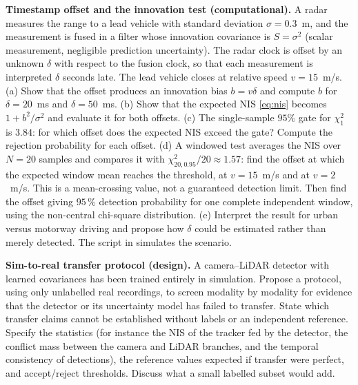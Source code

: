 \begin{prob}\label{prob:ch08:3}
\textbf{Timestamp offset and the innovation test (computational).} A radar measures the range to a lead vehicle with standard deviation $\sigma=0.3$~m, and the measurement is fused in a filter whose innovation covariance is $S=\sigma^2$ (scalar measurement, negligible prediction uncertainty). The radar clock is offset by an unknown $\delta$ with respect to the fusion clock, so that each measurement is interpreted $\delta$ seconds late. The lead vehicle closes at relative speed $v=15$~m/s. (a) Show that the offset produces an innovation bias $b=v\delta$ and compute $b$ for $\delta=20$~ms and $\delta=50$~ms. (b) Show that the expected NIS \eqref{eq:nis} becomes $1+b^2/\sigma^2$ and evaluate it for both offsets. (c) The single-sample $95\%$ gate for $\chi^2_1$ is $3.84$: for which offset does the expected NIS exceed the gate? Compute the rejection probability for each offset. (d) A windowed test averages the NIS over $N=20$ samples and compares it with $\chi^2_{20,0.95}/20\approx1.57$: find the offset at which the expected window mean reaches the threshold, at $v=15$~m/s and at $v=2$~m/s. This is a mean-crossing value, not a guaranteed detection limit. Then find the offset giving $95\,\%$ detection probability for one complete independent window, using the non-central chi-square distribution. (e) Interpret the result for urban versus motorway driving and propose how $\delta$ could be estimated rather than merely detected. The script  in  simulates the scenario.
\end{prob}

\begin{prob}\label{prob:ch08:4}
\textbf{Sim-to-real transfer protocol (design).} A camera--LiDAR detector with learned covariances has been trained entirely in simulation. Propose a protocol, using only unlabelled real recordings, to screen modality by modality for evidence that the detector or its uncertainty model has failed to transfer. State which transfer claims cannot be established without labels or an independent reference. Specify the statistics (for instance the NIS of the tracker fed by the detector, the conflict mass between the camera and LiDAR branches, and the temporal consistency of detections), the reference values expected if transfer were perfect, and accept/reject thresholds. Discuss what a small labelled subset would add.
\end{prob}


